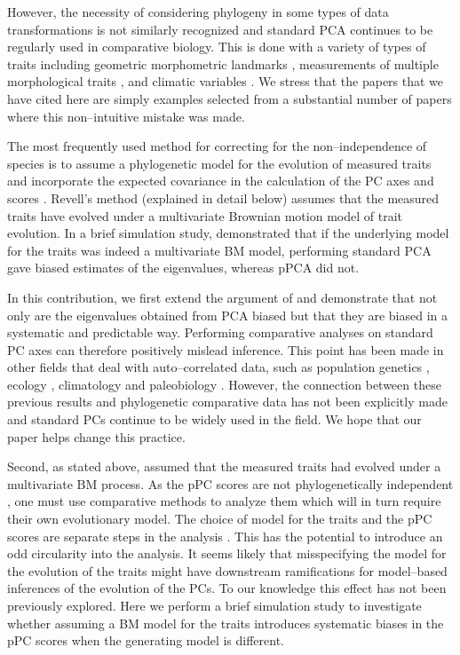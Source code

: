 \documentclass[a4paper,12pt]{article}
\begin{document}
However, the necessity of considering phylogeny in some types of data transformations \citep{Revell2008} is not similarly recognized and standard PCA continues to be regularly used in comparative biology. This is done with a variety of types of traits including geometric morphometric landmarks \citep[e.g.,][]{Dornburg2011, Hunt2013}, measurements of multiple morphological traits \citep[e.g.,][]{Harmon2010, BergmannIrshick2012, Weir2012, Pienaar2013, Price2014}, and climatic variables \citep[e.g.,][]{KozakWiens2010, Schnitzler2012}. We stress that the papers that we have cited here are simply examples selected from a substantial number of papers where this non--intuitive mistake was made.

The most frequently used method for correcting for the non--independence of species is to assume a phylogenetic model for the evolution of measured traits and incorporate the expected covariance in the calculation of the PC axes and scores \citep{Revell2008}. Revell's method (explained in detail below) assumes that the measured traits have evolved under a multivariate Brownian motion \citep[BM;][]{Edwards1964} model of trait evolution. In a brief simulation study, \citet{Revell2008} demonstrated that if the underlying model for the traits was indeed a multivariate BM model, performing standard PCA gave biased estimates of the eigenvalues, whereas pPCA did not.

In this contribution, we first extend the argument of \citet{Revell2008} and demonstrate that not only are the eigenvalues obtained from PCA biased but that they are biased in a systematic and predictable way. Performing comparative analyses on standard PC axes can therefore positively mislead inference. This point has been made in other fields that deal with auto--correlated data, such as population genetics \citep{Novembre}, ecology \citep{Podani2002}, climatology \citep{Richman1986} and paleobiology \citep{Bookstein2012}. However, the connection between these previous results and phylogenetic comparative data has not been explicitly made and standard PCs continue to be widely used in the field. We hope that our paper helps change this practice.

Second, as stated above, \citet{Revell2008} assumed that the measured traits had evolved under a multivariate BM process. As the pPC scores are not phylogenetically independent \citep[][see below]{Revell2008, Polly2013}, one must use comparative methods to analyze them which will in turn require their own evolutionary model. The choice of model for the traits and the pPC scores are separate steps in the analysis \citep{Revell2008}. 
This has the potential to introduce an odd circularity into the analysis. It seems likely that misspecifying the model for the evolution of the traits might have downstream ramifications for model--based inferences of the evolution of the PCs. To our knowledge this effect has not been previously explored. Here we perform a brief simulation study to investigate whether assuming a BM model for the traits introduces systematic biases in the pPC scores when the generating model is different.  
\end{document}
